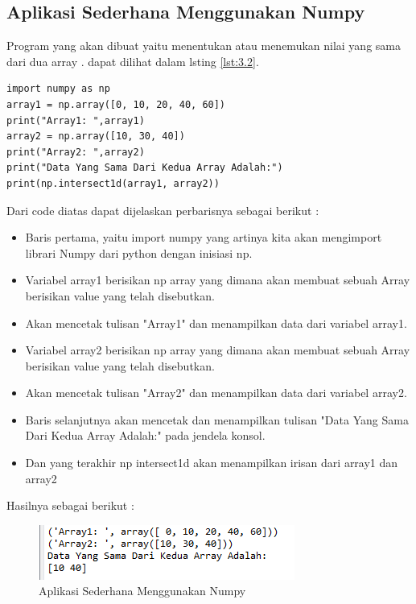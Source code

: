 \subsection{ Aplikasi Sederhana Menggunakan Numpy}
Program yang akan dibuat yaitu menentukan atau menemukan  nilai yang sama dari dua array . dapat dilihat dalam lsting \ref{lst:3.2}.
\begin{lstlisting}[caption=Code Program Sederhana Numpy,label={lst:3.2}]
import numpy as np
array1 = np.array([0, 10, 20, 40, 60])
print("Array1: ",array1)
array2 = np.array([10, 30, 40])
print("Array2: ",array2)
print("Data Yang Sama Dari Kedua Array Adalah:")
print(np.intersect1d(array1, array2))
\end{lstlisting}

Dari code diatas dapat dijelaskan perbarisnya sebagai berikut :\\
\begin{itemize}
\item
Baris pertama, yaitu import numpy yang artinya kita akan mengimport librari Numpy dari python dengan inisiasi np.
\item
Variabel array1 berisikan np array yang dimana akan membuat sebuah Array berisikan value yang telah disebutkan.
\item
Akan mencetak tulisan "Array1" dan menampilkan data dari variabel array1.
\item
Variabel array2 berisikan np array yang dimana akan membuat sebuah Array berisikan value yang telah disebutkan.
\item
Akan mencetak tulisan "Array2" dan menampilkan data dari variabel array2.
\item
Baris selanjutnya akan mencetak dan menampilkan tulisan "Data Yang Sama Dari Kedua Array Adalah:" pada jendela konsol.
\item
Dan yang terakhir np intersect1d akan menampilkan irisan dari array1 dan array2
\end{itemize}

Hasilnya sebagai berikut :
\begin{figure}[ht]
\centering
\includegraphics[scale=0.5]{figures/praktek2.png}
\caption{Aplikasi Sederhana Menggunakan Numpy}
\label{Praktek}
\end{figure}
